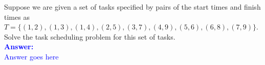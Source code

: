 \item{}
Suppose we are given a set of tasks specified by pairs of the start times and
finish times as $T=\lbrace(1,2),(1,3),(1,4),(2,5),(3,7),(4,9),(5,6),(6,8),(7,9)
\rbrace$. Solve the task scheduling problem for this set of tasks.\\[12pt]
\ifanswers
\textcolor{blue}{
\textbf{Answer:}\\[6pt]
Answer goes here
}
\newpage
\fi
